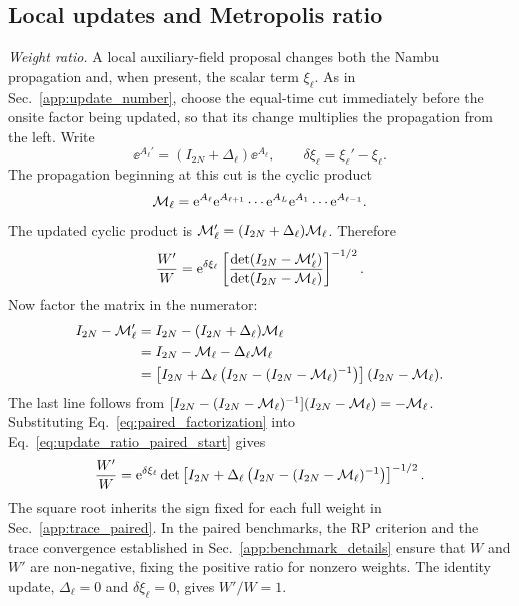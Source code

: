 \subsection{Local updates and Metropolis ratio}
\label{app:update_paired}

\emph{Weight ratio.} A local auxiliary-field proposal changes both the Nambu propagation and, when present, the scalar term $\xi_\ell$. As in Sec.~\ref{app:update_number}, choose the equal-time cut immediately before the onsite factor being updated, so that its change multiplies the propagation from the left. Write
\begin{equation}
    \ee^{A_\ell'}=(I_{2N}+\Delta_\ell)\ee^{A_\ell},\qquad
    \delta\xi_\ell=\xi_\ell'-\xi_\ell.
    \label{eq:delta_def}
\end{equation}
The propagation beginning at this cut is the cyclic product
\begin{equation}
    \mathcal{M}_\ell=\mathrm{e}^{A_\ell}\mathrm{e}^{A_{\ell+1}}\cdots\mathrm{e}^{A_L}\mathrm{e}^{A_1}\cdots\mathrm{e}^{A_{\ell-1}}.
\end{equation}
The updated cyclic product is $\mathcal{M}_\ell'=(I_{2N}+\Delta_\ell)\mathcal{M}_\ell$. Therefore
\begin{equation}
    \frac{W'}{W}
    =
    \mathrm{e}^{\delta\xi_\ell}
    \left[
    \frac{\det(I_{2N}-\mathcal{M}_\ell')}
         {\det(I_{2N}-\mathcal{M}_\ell)}
    \right]^{-1/2}.
    \label{eq:update_ratio_paired_start}
\end{equation}
Now factor the matrix in the numerator:
\begin{equation}
\begin{aligned}
    I_{2N}-\mathcal{M}_\ell'
    &= I_{2N}-(I_{2N}+\Delta_\ell)\mathcal{M}_\ell \\
    &= I_{2N}-\mathcal{M}_\ell-\Delta_\ell\mathcal{M}_\ell \\
    &=
    \left[
    I_{2N}
    +\Delta_\ell\left(I_{2N}-(I_{2N}-\mathcal{M}_\ell)^{-1}\right)
    \right]
    (I_{2N}-\mathcal{M}_\ell).
\end{aligned}
    \label{eq:paired_factorization}
\end{equation}
The last line follows from
$[I_{2N}-(I_{2N}-\mathcal{M}_\ell)^{-1}](I_{2N}-\mathcal{M}_\ell)=-\mathcal{M}_\ell$. Substituting Eq.~\eqref{eq:paired_factorization} into Eq.~\eqref{eq:update_ratio_paired_start} gives
\begin{equation}
    \frac{W'}{W}
    =
    \mathrm{e}^{\delta\xi_\ell}
    \det\left[
    I_{2N}
    +\Delta_\ell\left(I_{2N}-(I_{2N}-\mathcal{M}_\ell)^{-1}\right)
    \right]^{-1/2}.
    \label{eq:update_ratio_main}
\end{equation}
The square root inherits the sign fixed for each full weight in Sec.~\ref{app:trace_paired}. In the paired benchmarks, the RP criterion and the trace convergence established in Sec.~\ref{app:benchmark_details} ensure that $W$ and $W'$ are non-negative, fixing the positive ratio for nonzero weights. The identity update, $\Delta_\ell=0$ and $\delta\xi_\ell=0$, gives $W'/W=1$.

